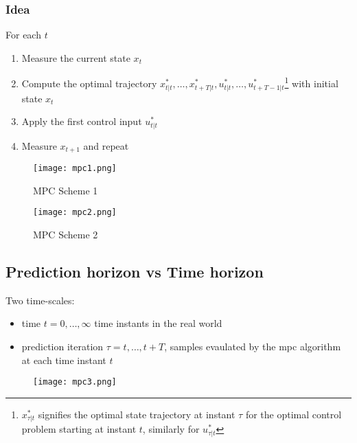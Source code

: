 \documentclass[openany]{book}
\theoremstyle{definition}
\theoremstyle{remark}
\begin{document}
\subsubsection{Idea}
For each $t$
\begin{enumerate}
    \item Measure the current state $x_t$ 
    \item Compute the optimal trajectory $x^*_{t|t},\dots,x^*_{t+T|t},u^*_{t|t},\dots,u^*_{t+T-1|t}$\footnote{$x^*_{\tau|t}$ signifies the optimal state trajectory at instant $\tau$ for the optimal control problem starting at instant $t$, similarly for $u^*_{\tau|t}$} with initial state $x_t$
    \item Apply the first control input $u^*_{t|t}$
    \item Measure $x_{t+1}$ and repeat
\end{enumerate}
\pagebreak
\begin{figure}[ht]
    \centering
    \begin{minipage}{0.45\textwidth}
        \centering
        \texttt{[image: mpc1.png]}
        \caption{MPC Scheme 1}
        \label{fig:mpc1}
    \end{minipage}
    \hfill
    \begin{minipage}{0.45\textwidth}
        \centering
        \texttt{[image: mpc2.png]}
        \caption{MPC Scheme 2}
        \label{fig:mpc2}
    \end{minipage}
\end{figure}


\subsection{Prediction horizon vs Time horizon}
Two time-scales: 
\begin{itemize}
    \item time $t=0,\dots,\infty$ time instants in the real world 
    \item prediction iteration $\tau=t,\dots,t+T$, samples evaulated by the mpc algorithm at each time instant $t$
\end{itemize}

\begin{figure}[ht]
    \centering
    \texttt{[image: mpc3.png]}
    \label{fig:mpc3}
\end{figure}
\end{document}
